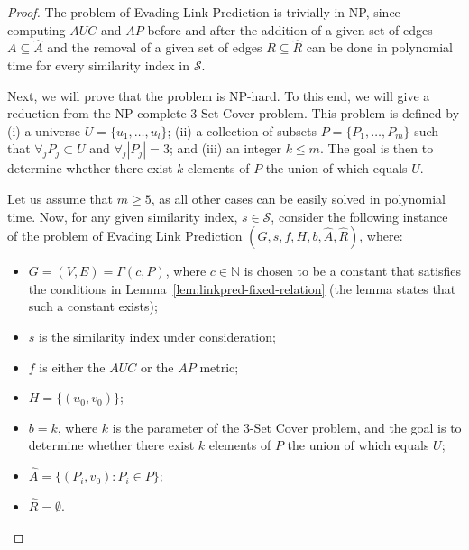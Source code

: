 \documentclass[twocolumn]{article}
\newcommand{\N}{\mathbb{N}}
\newcommand{\ROC}{\mathit{AUC}}
\newcommand{\AP}{\mathit{AP}}
\newcommand{\FA}{\widehat{A}}
\newcommand{\FR}{\widehat{R}}
\newcommand{\Hide}{H}
\begin{document}

\begin{proof}
The problem of Evading Link Prediction is trivially in NP, since computing $\ROC$ and $\AP$ before and after the addition of a given set of edges $A \subseteq \FA$ and the removal of a given set of edges $R \subseteq \FR$ can be done in polynomial time for every similarity index in $\mathcal{S}$.

Next, we will prove that the problem is NP-hard. To this end, we will give a reduction from the NP-complete 3-Set Cover problem. This problem is defined by (i) a universe $U=\{u_1, \ldots, u_l\}$; (ii) a collection of subsets $P = \{P_1, \ldots, P_m\}$ such that $\forall_j P_j\subset U$ and $\forall_j \left|P_j\right|=3$; and (iii) an integer $k\leq m$. The goal is then to determine whether there exist $k$ elements of $P$ the union of which equals $U$.


Let us assume that $m \geq 5$, as all other cases can be easily solved in polynomial time. Now, for any given similarity index, $s \in \mathcal{S}$, consider the following instance of the problem of Evading Link Prediction $(G,s,f,\Hide,b,\FA,\FR)$, where:

\begin{itemize}\itemsep-0.3em
\item $G = (V,E) = \Gamma(c,P)$, where $c \in \N$ is chosen to be a constant that satisfies the conditions in Lemma~\ref{lem:linkpred-fixed-relation} (the lemma states that such a constant exists);
\item $s$ is the similarity index under consideration;
\item $f$ is either the $\ROC$ or the $\AP$ metric;
\item $\Hide = \{(u_0,v_0)\}$;
\item $b=k$, where $k$ is the parameter of the 3-Set Cover problem, and the goal is to determine whether there exist $k$ elements of $P$ the union of which equals $U$;
\item $\FA=\{(P_i,v_0) : P_i \in P\}$;
\item $\FR=\emptyset$.
\end{itemize}


\end{proof}
\end{document}
